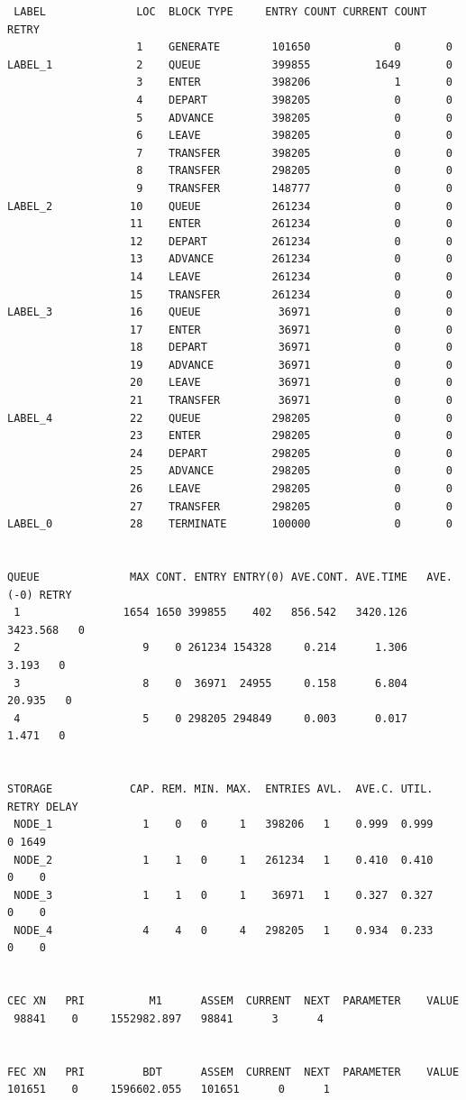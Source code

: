 \documentclass{article}
\begin{document}
\begin{lstlisting}
 LABEL              LOC  BLOCK TYPE     ENTRY COUNT CURRENT COUNT RETRY
                    1    GENERATE        101650             0       0
LABEL_1             2    QUEUE           399855          1649       0
                    3    ENTER           398206             1       0
                    4    DEPART          398205             0       0
                    5    ADVANCE         398205             0       0
                    6    LEAVE           398205             0       0
                    7    TRANSFER        398205             0       0
                    8    TRANSFER        298205             0       0
                    9    TRANSFER        148777             0       0
LABEL_2            10    QUEUE           261234             0       0
                   11    ENTER           261234             0       0
                   12    DEPART          261234             0       0
                   13    ADVANCE         261234             0       0
                   14    LEAVE           261234             0       0
                   15    TRANSFER        261234             0       0
LABEL_3            16    QUEUE            36971             0       0
                   17    ENTER            36971             0       0
                   18    DEPART           36971             0       0
                   19    ADVANCE          36971             0       0
                   20    LEAVE            36971             0       0
                   21    TRANSFER         36971             0       0
LABEL_4            22    QUEUE           298205             0       0
                   23    ENTER           298205             0       0
                   24    DEPART          298205             0       0
                   25    ADVANCE         298205             0       0
                   26    LEAVE           298205             0       0
                   27    TRANSFER        298205             0       0
LABEL_0            28    TERMINATE       100000             0       0


QUEUE              MAX CONT. ENTRY ENTRY(0) AVE.CONT. AVE.TIME   AVE.(-0) RETRY
 1                1654 1650 399855    402   856.542   3420.126   3423.568   0
 2                   9    0 261234 154328     0.214      1.306      3.193   0
 3                   8    0  36971  24955     0.158      6.804     20.935   0
 4                   5    0 298205 294849     0.003      0.017      1.471   0


STORAGE            CAP. REM. MIN. MAX.  ENTRIES AVL.  AVE.C. UTIL. RETRY DELAY
 NODE_1              1    0   0     1   398206   1    0.999  0.999    0 1649
 NODE_2              1    1   0     1   261234   1    0.410  0.410    0    0
 NODE_3              1    1   0     1    36971   1    0.327  0.327    0    0
 NODE_4              4    4   0     4   298205   1    0.934  0.233    0    0


CEC XN   PRI          M1      ASSEM  CURRENT  NEXT  PARAMETER    VALUE
 98841    0     1552982.897   98841      3      4


FEC XN   PRI         BDT      ASSEM  CURRENT  NEXT  PARAMETER    VALUE
101651    0     1596602.055   101651      0      1
\end{lstlisting}
\end{document}
